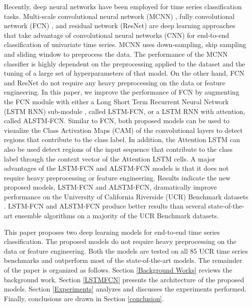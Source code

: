 \documentclass[article]{IEEEtran}
\begin{document}
\par Recently, deep neural networks have been employed for time series classification tasks. Multi-scale convolutional neural network (MCNN) \cite{cui2016multi}, fully convolutional network (FCN) \cite{wang2017time}, and residual network (ResNet) \cite{wang2017time} are deep learning approaches that take advantage of convolutional neural networks (CNN) for end-to-end classification of univariate time series. MCNN uses down-sampling, skip sampling and sliding window to preprocess the data. The performance of the MCNN classifier is highly dependent on the preprocessing applied to the dataset and the tuning of a large set of hyperparameters of that model. On the other hand, FCN and ResNet do not require any heavy preprocessing on the data or feature engineering. In this paper, we improve the performance of FCN by augmenting the FCN module with either a Long Short Term Recurrent Neural Network (LSTM RNN) sub-module , called LSTM-FCN, or a LSTM RNN  with attention, called ALSTM-FCN. Similar to FCN, both proposed models can be used to visualize the Class Activation Maps (CAM) of the convolutional layers to detect regions that contribute to the class label. In addition, the Attention LSTM can also be used detect regions of the input sequence that contribute to the class label through the context vector of the Attention LSTM cells.  A major advantages of the LSTM-FCN and ALSTM-FCN models is that it does not require heavy preprocessing or feature engineering. Results indicate the new proposed models, LSTM-FCN and ALSTM-FCN, dramatically improve performance on the University of California Riverside (UCR) Benchmark datasets \cite{UCRArchive}. LSTM-FCN and ALSTM-FCN produce better results than several state-of-the-art ensemble algorithms on a majority of the UCR Benchmark datasets. 
\par This paper proposes two deep learning models for end-to-end time series classification. The proposed models do not require heavy preprocessing on the data or feature engineering. Both the models are tested on all 85 UCR time series benchmarks and outperform most of the state-of-the-art models. The remainder of the paper is organized as follows. Section \ref{Background Works} reviews the background work. Section \ref{LSTMFCN} presents the architecture of the proposed models. Section \ref{Experiments} analyzes and discusses the experiments performed. Finally, conclusions are drawn in Section \ref{conclusion}. 
\end{document}
